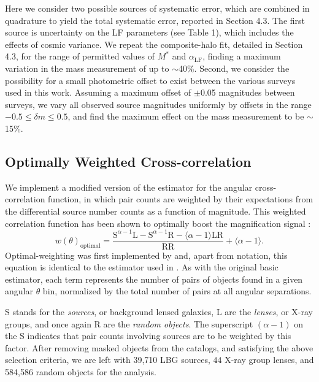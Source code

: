 \documentclass[iop]{emulateapj}
\begin{document}
Here we consider two possible sources of systematic error, which are combined in quadrature to yield the total systematic error, reported in Section 4.3. The first source is uncertainty on the LF parameters (see Table 1), which includes the effects of cosmic variance. We repeat the composite-halo fit, detailed in Section 4.3, for the range of permitted values of $M^\ast$ and $\alpha_{\text{LF}}$, finding a maximum variation in the mass measurement of up to $\sim$40\%. Second, we consider the possibility for a small photometric offset to exist between the various surveys used in this work. Assuming a maximum offset of $\pm$0.05 magnitudes between surveys, we vary all observed source magnitudes uniformly by offsets in the range $-0.5 \leq \delta m \leq 0.5$, and find the maximum effect on the mass measurement to be $\sim$15\%.

\subsection{Optimally Weighted Cross-correlation}
We implement a modified version of the \citet{LandySzalay93} estimator for the angular cross-correlation function, in which pair counts are weighted by their expectations from the differential source number counts as a function of magnitude. This weighted correlation function has been shown to optimally boost the magnification signal \citep{Menard03}:    
\begin{equation}
w(\theta)_{\text{optimal}}=\frac{\text{S}^{\alpha-1} \text{L} - \text{S}^{\alpha-1} \text{R} - \langle \alpha-1 \rangle \text{LR}}{\text{RR}} + \langle \alpha-1 \rangle .
\end{equation}
Optimal-weighting was first implemented by \citet{Scranton05} and, apart from notation, this equation is identical to the estimator used in \citet{Hildebrandt09b}.  As with the original basic estimator, each term represents the number of pairs of objects found in a given angular $\theta$ bin, normalized by the total number of pairs at all angular separations.  

S stands for the {\it sources}, or background lensed galaxies, L are the {\it lenses}, or X-ray groups, and once again R are the {\it random objects}. The superscript $(\alpha-1)$ on the S indicates that pair counts involving sources are to be weighted by this factor. After removing masked objects from the catalogs, and satisfying the above selection criteria, we are left with 39,710 LBG sources, $44$ X-ray group lenses, and 584,586 random objects for the analysis.
\end{document}
